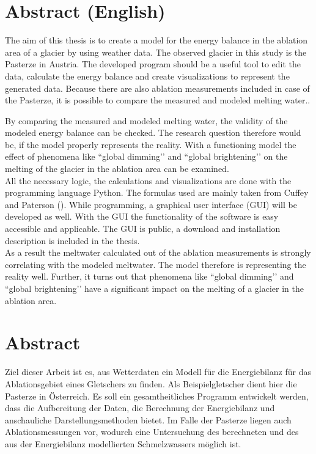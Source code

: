 \documentclass[11pt,a4paper]{article}
\begin{document}
\pagebreak
\ofoot{{\small \pagemark}}
\section*{Abstract (English)}
The aim of this thesis is to create a model for the energy balance in the ablation area of a glacier by using weather data. The observed glacier in this study is the Pasterze in Austria. The developed program should be a useful tool to edit the data, calculate the energy balance and create visualizations to represent the generated data. Because there are also ablation measurements included in case of the Pasterze, it is possible to compare the measured and modeled melting water..

By comparing the measured and modeled melting water, the validity of the modeled energy balance can be checked. The research question therefore would be, if the model properly represents the reality. With a functioning model the effect of phenomena like ``global dimming’’ and ``global brightening’’ on the melting of the glacier in the ablation area can be examined.\\

All the necessary logic, the calculations and visualizations are done with the programming language Python. The formulas used are mainly taken from Cuffey and Paterson (\citeyear[153-157]{ThePhysicsOfGlaciers}). While programming, a graphical user interface (GUI) will be developed as well. With the GUI the functionality of the software is easy accessible and applicable. The GUI is public, a download and installation description is included in the thesis.\\

As a result the meltwater calculated out of the ablation measurements is strongly correlating with  the modeled meltwater. The model therefore is representing the reality well. Further, it turns out that phenomena like ``global dimming’’ and ``global brightening’’ have a significant impact on the melting of a glacier in the ablation area.
 
\pagebreak
\section*{Abstract}

Ziel dieser Arbeit ist es, aus Wetterdaten ein Modell für die Energiebilanz für das Ablationsgebiet eines Gletschers zu finden. Als Beispielgletscher dient hier die Pasterze in Österreich. Es soll ein gesamtheitliches Programm entwickelt werden, dass die Aufbereitung der Daten, die Berechnung der Energiebilanz und anschauliche Darstellungsmethoden bietet. Im Falle der Pasterze liegen auch Ablationsmessungen vor, wodurch eine Untersuchung des berechneten und des aus der Energiebilanz modellierten Schmelzwassers möglich ist.\\
\end{document}
